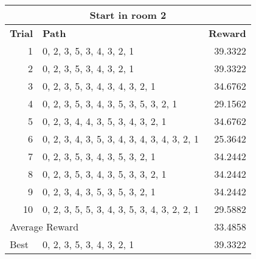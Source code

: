 \documentclass[../Head/Main.tex]{subfiles}
\begin{document}
\begin{tabular}{r l r}
	\hline
	\multicolumn{3}{c}{\textbf{\large Start in room 2}} \\
	\hline 
	\multicolumn{1}{l}{\textbf{Trial}} & \textbf{Path} & \textbf{Reward} \\ 			\hline
	1  & 0, 2, 3, 5, 3, 4, 3, 2, 1                  & 39.3322\\
	2  & 0, 2, 3, 5, 3, 4, 3, 2, 1                  & 39.3322\\
	3  & 0, 2, 3, 5, 3, 4, 3, 4, 3, 2, 1            & 34.6762\\
	4  & 0, 2, 3, 5, 3, 4, 3, 5, 3, 5, 3, 2, 1      & 29.1562\\
	5  & 0, 2, 3, 4, 4, 3, 5, 3, 4, 3, 2, 1         & 34.6762\\
	6  & 0, 2, 3, 4, 3, 5, 3, 4, 3, 4, 3, 4, 3, 2, 1& 25.3642\\
	7  & 0, 2, 3, 5, 3, 4, 3, 5, 3, 2, 1            & 34.2442\\
	8  & 0, 2, 3, 5, 3, 4, 3, 5, 3, 3, 2, 1         & 34.2442\\
	9  & 0, 2, 3, 4, 3, 5, 3, 5, 3, 2, 1            & 34.2442\\
	10 & 0, 2, 3, 5, 5, 3, 4, 3, 5, 3, 4, 3, 2, 2, 1& 29.5882\\
	\hline
	\multicolumn{2}{l}{Average Reward} & 33.4858 \\
	\hline	
	\multicolumn{1}{l}{Best} & 0, 2, 3, 5, 3, 4, 3, 2, 1  & 39.3322\\
	\hline
\end{tabular}
\end{document}
